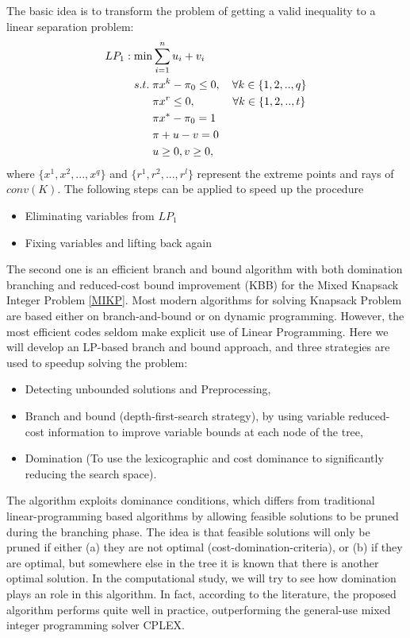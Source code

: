 \documentclass[a4paper,11pt]{article}
\begin{document}
The basic idea is to transform the problem of getting a valid inequality to a linear separation problem:
\begin{align}
LP_1: \min &\sum_{i=1}^{n} u_i+v_i \notag\\
s.t. \;  & \pi x^k-\pi_0\leq 0,  \quad \forall k\in\{1,2,..,q\} \notag\\
& \pi x^r\leq 0, \quad~ \qquad \forall  k\in\{1,2,..,t\} \notag\\
& \pi x^*-\pi_0 = 1 \notag\\
& \pi+u-v = 0 \notag\\
&u\geq 0, v\geq 0\notag,
\end{align}
where $\{x^1, x^2,...,x^q\}$ and $\{r^1,r^2,..., r^l\}$ represent the extreme points and rays of $conv(K)$. The following steps can be applied to speed up the procedure
\begin{itemize}
 \item Eliminating variables from $LP_1$
 \item Fixing variables and lifting back again
\end{itemize}

The second one is an efficient branch and bound algorithm with both domination branching and reduced-cost bound improvement (KBB) for the Mixed 
Knapsack Integer Problem \eqref{MIKP}. Most modern algorithms for solving Knapsack Problem are based either on branch-and-bound or on dynamic 
programming. However, the most efficient codes seldom make explicit use of Linear Programming. Here we will develop an LP-based branch and bound 
approach, and three strategies are used to speedup solving the problem:
\begin{itemize}
 \item Detecting unbounded solutions and Preprocessing,
 \item Branch and bound (depth-first-search strategy), by using variable reduced-cost information to improve variable bounds at each node of the tree,
 \item Domination (To use the lexicographic and cost dominance to significantly reducing the search space). 
\end{itemize}

The algorithm exploits dominance conditions, which differs from traditional linear-programming based algorithms by allowing feasible 
solutions to be pruned during the branching phase. The idea is that feasible solutions will only be pruned if either (a) they are not 
optimal (cost-domination-criteria), or (b) if they are optimal, but somewhere else in the tree it is known that there is another optimal 
solution. In the computational study, we will try to see how  domination plays an role in this algorithm. In fact, according to the literature, the 
proposed algorithm performs quite well in practice, outperforming the general-use mixed integer programming solver CPLEX. 
\end{document}
